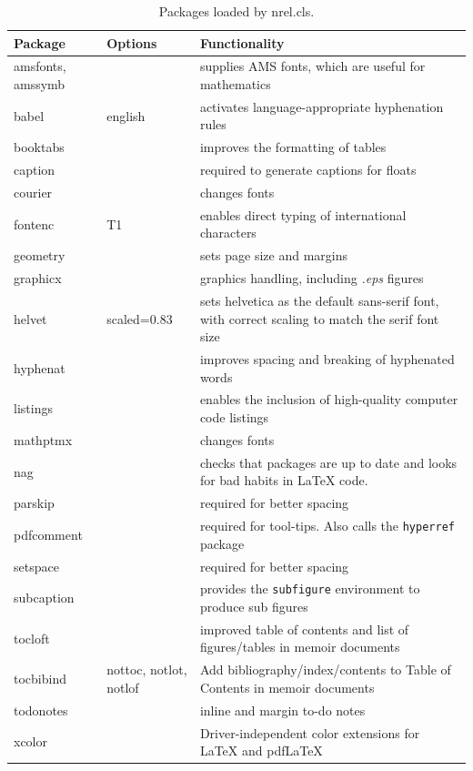 \begin{table}[!h]
\centering
\caption[Packages loaded by the nrel.cls class]{Packages loaded by nrel.cls.}
\label{Tab:Packages}
\begin{tabular*}{\textwidth}{llp{}}
\toprule
Package & Options & Functionality\\
\midrule
amsfonts, amssymb & & supplies AMS fonts, which are useful for mathematics \\
babel & english & activates language-appropriate hyphenation rules\\
booktabs & & improves the formatting of tables \\
caption & & required to generate captions for floats\\
courier& & changes fonts \\
fontenc & T1 & enables direct typing of international characters \\
geometry & & sets page size and margins \\
graphicx & & graphics handling, including \emph{.eps} figures \\
helvet& scaled=0.83 & sets helvetica as the default sans-serif font, with correct scaling to match the serif font size\\
hyphenat & & improves spacing and breaking of hyphenated words \\
listings & & enables the inclusion of high-quality computer code listings\\
mathptmx& & changes fonts \\
nag & & checks that packages are up to date and looks for bad habits in LaTeX code. \\
parskip & & required for better spacing\\
pdfcomment & & required for tool-tips. Also calls the \texttt{hyperref} package  \\
setspace & & required for better spacing\\
subcaption & & provides the \texttt{subfigure} environment to produce sub figures \\
tocloft & & improved table of contents and list of figures/tables in memoir documents\\
tocbibind & nottoc, notlot, notlof & Add bibliography/index/contents to Table of Contents in memoir documents\\
todonotes & & inline and margin to-do notes \\
xcolor & & Driver-independent color extensions for LaTeX and pdfLaTeX\\
\bottomrule
\end{tabular*}
\end{table}

